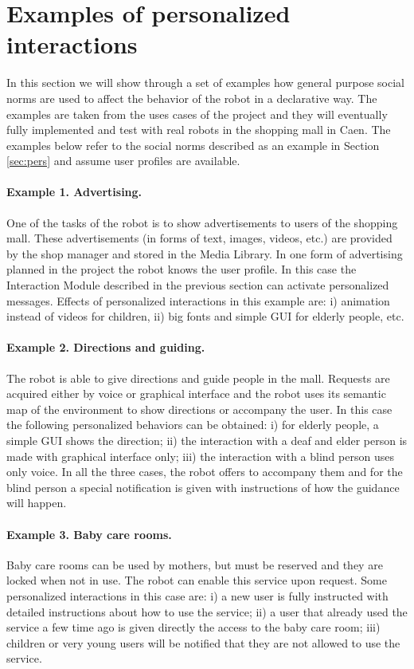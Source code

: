 \vspace{-0.2cm}
\section{Examples of personalized interactions}
\vspace{-0.1cm}
In this section we will show through a set of examples how general purpose social norms are used to affect the behavior of the robot in a declarative way. The examples are taken from the uses cases of the \coaches project and they will eventually fully implemented and test with real robots in the shopping mall in Caen. The examples below refer to the social norms described as an example in Section \ref{sec:pers} and assume user profiles are available.

\paragraph{Example 1. Advertising.} One of the tasks of the \coaches robot is to show advertisements to users of the shopping mall. These advertisements (in forms of text, images, videos, etc.) are provided by the shop manager and stored in the Media Library. 
In one form of advertising planned in the project the robot knows the user profile. In this case the Interaction Module described in the previous section can activate personalized messages.
Effects of personalized interactions in this example are: i) animation instead of videos for children, ii) big fonts and simple GUI for elderly people, etc. 

\paragraph{Example 2. Directions and guiding.} The robot is able to give directions and guide people in the mall. Requests are acquired either by voice or graphical interface and the robot uses its semantic map of the environment to show directions or accompany the user. In this case the following personalized behaviors can be obtained: i) for elderly people, a simple GUI shows the direction; ii) the interaction with a deaf and elder person is made with graphical interface only; iii) the interaction with a blind person uses only voice. In all the three cases, the robot offers to accompany them and for the blind person a special notification is given with instructions of how the guidance will happen.

\paragraph{Example 3. Baby care rooms.} Baby care rooms can be used by mothers, but must be reserved and they are locked when not in use. The robot can enable this service upon request. Some personalized interactions in this case are: i) a new user is fully instructed with detailed instructions about how to use the service; ii) a user that already used the service a few time ago is given directly the access to the baby care room; iii) children or very young users will be notified that they are not allowed to use the service.

